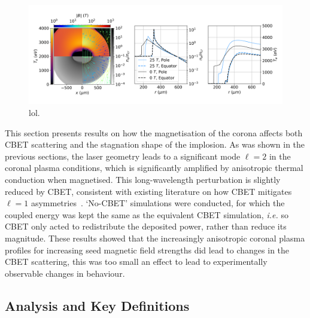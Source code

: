 \begin{figure}[t!]
    \includegraphics[width=\linewidth]{Results2/Images/ne_te_Bstream_comp_alt050.png}
    \centering
    \caption{lol.}%
    \label{fig:Res2_ne_te_Bstream_comp_alt050}
\end{figure}

This section presents results on how the magnetisation of the corona affects both \ac{CBET} scattering and the stagnation shape of the implosion.
As was shown in the previous sections, the laser geometry leads to a significant mode $\ell=2$ in the coronal plasma conditions, which is significantly amplified by anisotropic thermal conduction when magnetised.
This long-wavelength perturbation is slightly reduced by \ac{CBET}, consistent with existing literature on how \ac{CBET} mitigates $\ell=1$ asymmetries~\cite{colaitis_inverse_2021}.
`No-\ac{CBET}' simulations were conducted, for which the coupled energy was kept the same as the equivalent \ac{CBET} simulation, \textit{i.e.} so \ac{CBET} only acted to redistribute the deposited power, rather than reduce its magnitude.
These results showed that the increasingly anisotropic coronal plasma profiles for increasing seed magnetic field strengths did lead to changes in the \ac{CBET} scattering, this was too small an effect to lead to experimentally observable changes in behaviour.

\subsection{Analysis and Key Definitions}%
\label{sec:Res2_analysis_definitions}

